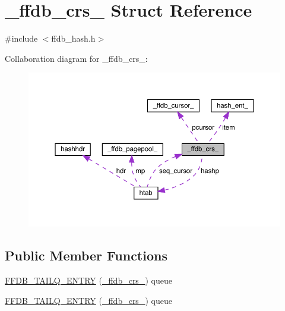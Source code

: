 \hypertarget{struct__ffdb__crs__}{}\section{\+\_\+ffdb\+\_\+crs\+\_\+ Struct Reference}
\label{struct__ffdb__crs__}


{\ttfamily \#include $<$ffdb\+\_\+hash.\+h$>$}



Collaboration diagram for \+\_\+ffdb\+\_\+crs\+\_\+\+:\nopagebreak
\begin{figure}[H]
\begin{center}
\leavevmode
\includegraphics[width=350pt]{d6/d73/struct__ffdb__crs____coll__graph}
\end{center}
\end{figure}
\subsection*{Public Member Functions}
\begin{DoxyCompactItemize}
\item 
\mbox{\hyperlink{struct__ffdb__crs___ab69f088c55ed68ebc0cc2ed6342ef782}{F\+F\+D\+B\+\_\+\+T\+A\+I\+L\+Q\+\_\+\+E\+N\+T\+RY}} (\mbox{\hyperlink{struct__ffdb__crs__}{\+\_\+ffdb\+\_\+crs\+\_\+}}) queue
\item 
\mbox{\hyperlink{struct__ffdb__crs___ab69f088c55ed68ebc0cc2ed6342ef782}{F\+F\+D\+B\+\_\+\+T\+A\+I\+L\+Q\+\_\+\+E\+N\+T\+RY}} (\mbox{\hyperlink{struct__ffdb__crs__}{\+\_\+ffdb\+\_\+crs\+\_\+}}) queue
\end{DoxyCompactItemize}
